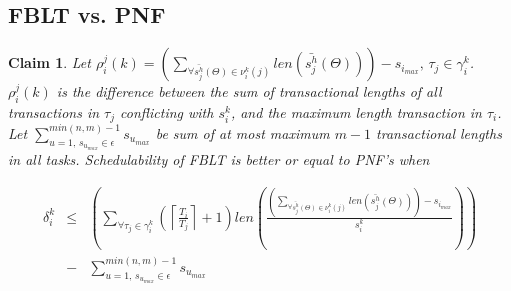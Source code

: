 \documentclass[a4paper,english]{article}
\newtheorem{clm}{Claim}
\begin{document}
\subsection{FBLT vs. PNF}
\label{sec:fblt vs pnf}

\begin{clm}\label{clm:fblt_pnf_edf}
Let $\rho_{i}^{j}(k)=\left(\sum_{\forall\bar{s_{j}^{h}}(\Theta)\in\nu_{i}^{k}(j)}len\left(\bar{s_{j}^{h}}(\Theta)\right)\right)-s_{i_{max}},\,\tau_{j}\in\gamma_{i}^{k}$. $\rho_{i}^{j}(k)$ is the difference between the sum of transactional
lengths of all transactions in $\tau_{j}$ conflicting with $s_{i}^{k}$,
and the maximum length transaction in $\tau_{i}$. Let $\sum_{u=1,\, s_{u_{max}}\in\epsilon}^{min(n,m)-1}s_{u_{max}}$ be sum of at most maximum $m-1$ transactional lengths in all tasks. Schedulability of FBLT is better or equal to PNF's when 

\begin{eqnarray}
\delta_{i}^{k} & \le & \left(\sum_{\forall\tau_{j}\in\gamma_{i}^{k}}\left(\left\lceil \frac{T_{i}}{T_{j}}\right\rceil +1\right)len\left(\frac{\left(\sum_{\forall\bar{s_{j}^{h}}(\Theta)\in\nu_{i}^{k}(j)}len\left(\bar{s_{j}^{h}}(\Theta)\right)\right)-s_{i_{max}}}{s_{i}^{k}}\right)\right)\\
& - & \sum_{u=1,\, s_{u_{max}}\in\epsilon}^{min(n,m)-1}s_{u_{max}}\label{eq:fblt_pnf_comparison_1-1-1-1_mod}
\end{eqnarray}


\end{clm}
\end{document}
